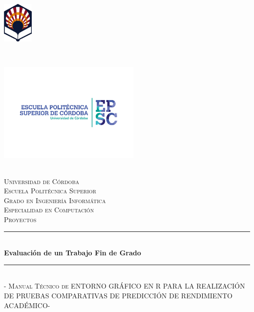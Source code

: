 \begin{titlepage}
	\begin{center}
		\begin{minipage}{5cm}
            \begin{flushleft}
                \includegraphics[width=1.5cm]{./img/logo_uco_sin_texto.png}
            \end{flushleft}
        \end{minipage}
        ~
        \begin{minipage}{7cm}
            \begin{flushright}
              \includegraphics[width=7cm]{img/logo_uco_epsc.png}
            \end{flushright}
        \end{minipage}\\[0.2cm]
		
		{\huge\scshape Universidad de Córdoba} \\[0.15cm]
		{\huge\scshape Escuela Politécnica Superior} \\[1cm]
		
		{\Large\scshape Grado en Ingeniería Informática} \\[0.15cm]
		{\Large\scshape Especialidad en Computación} \\[0.5cm]
		{\large\scshape Proyectos} \\
		
		\rule{\textwidth}{0.04cm} \\[0.3cm]
		{\huge\bfseries Evaluación de un Trabajo Fin de Grado
} \\
		\rule{\textwidth}{0.04cm} \\[0.25cm]
		
		{\large\scshape - Manual Técnico de ENTORNO GRÁFICO EN R PARA LA REALIZACIÓN DE PRUEBAS COMPARATIVAS DE PREDICCIÓN DE RENDIMIENTO ACADÉMICO-} \\[1cm]
		

\end{center}
\end{titlepage}
